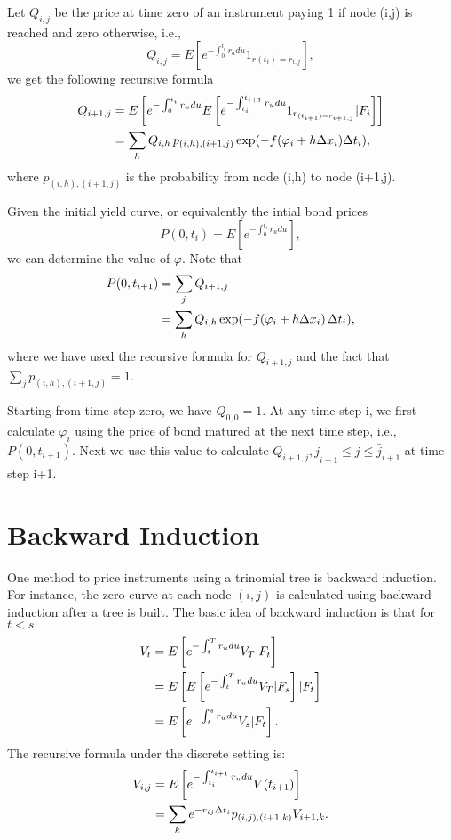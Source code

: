 Let $Q_{i,j}$ be the price at time zero of an instrument paying 1 if node
(i,j) is reached and zero otherwise, i.e.,
\[
  Q_{i,j} = E \left[ e^{-\int_0^{t_i} r_u du} 1_{r(t_i)=r_{i,j}} \right],
\]
we get the following recursive formula
\begin{align*}
  Q_{i+1,j} &= E \left[ e^{-\int_0^{t_i} r_u du} 
                E \left[
                    e^{-\int_{t_i}^{t_{i+1}} r_u du} 1_{r_{(t_{i+1})=r_{i+1,j}}} 
                    | F_i 
                  \right] 
                \right]  \notag \\
    &= \sum_h Q_{i,h} \, p_{(i,h),(i+1,j)} 
      \exp( -f(\varphi_i+h\Delta x_i) \Delta t_i),
\end{align*}
where $p_{(i,h),(i+1,j)}$ is the probability from node (i,h) to node
(i+1,j).

Given the initial yield curve, or equivalently the intial bond prices
\[
  P(0,t_i) = E \left[ e^{-\int_0^{t_i} r_u du} \right],
\]
we can determine the value of $\varphi$. Note that
\begin{align*}
  P(0, t_{i+1}) &= \sum_j Q_{i+1,j}  \notag \\
     &= \sum_h Q_{i,h}
      \exp( -f(\varphi_i+h\Delta x_i)\, \Delta t_i),
\end{align*}
where we have used the recursive formula for $Q_{i+1,j}$ and the fact that
$\sum_j p_{(i,h),(i+1,j)}=1$.

Starting from time step zero, we have $Q_{0,0}=1$. At any time
step i, we first calculate $\varphi_i$ using the price of bond matured at the
next time step, i.e., $P(0,t_{i+1})$. Next we use this value to calculate 
$Q_{i+1,j}, \underline{j}_{i+1}\leq j \leq \bar{j}_{i+1}$ at time step i+1.


\section{Backward Induction} \label{S:back_ind}
One method to price instruments using a trinomial tree is backward induction.
For instance, the zero curve at each node $(i,j)$ is calculated using backward
induction after a tree is built. The basic idea of backward induction is 
that for $t<s$
\begin{align*}
  V_t &= E \left[ e^{-\int_t^T r_u du} V_T | F_t \right]  \notag \\
      &= E \left[ 
            E \left[ e^{-\int_t^T r_u du} V_T | F_s \right]  | F_t
           \right] \notag \\
      &= E \left[ e^{-\int_t^s r_u du} V_s | F_t \right].
\end{align*}
The recursive formula under the discrete setting is:
\begin{align} \label{E:back_ind1}
  V_{i,j} &= E \left[ e^{-\int_{t_i}^{t_{i+1}} r_u du} V(t_{i+1}) \right] 
             \notag \\
          &= \sum_k e^{-r_{ij} \Delta t_i} p_{(i,j),(i+1,k)} V_{i+1,k}.
\end{align}

